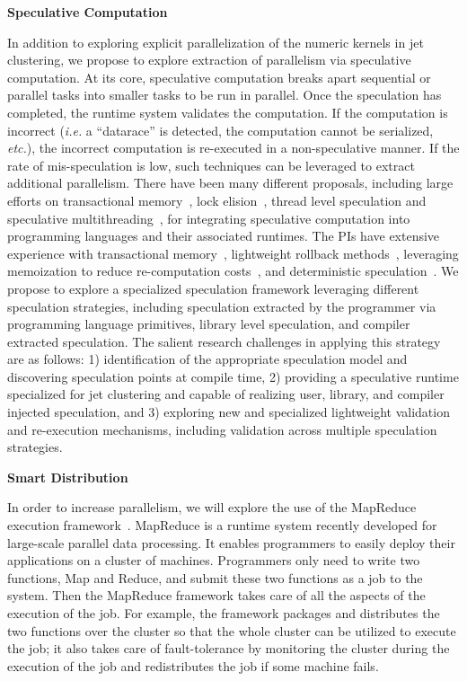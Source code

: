 \documentclass[times,11pt]{article}
\begin{document}
\bigskip
\noindent
{\bf Speculative Computation}
\bigskip

In addition to exploring explicit parallelization of the numeric kernels in jet clustering, we
propose to explore extraction of parallelism via speculative computation. At its core, speculative
computation breaks apart sequential or parallel tasks into smaller tasks to be run in parallel. Once
the speculation has completed, the runtime system validates the computation. If the computation is
incorrect ({\em i.e.} a ``datarace'' is detected, the computation cannot be serialized, {\em etc.}), the
incorrect computation is re-executed in a non-speculative manner.  If the rate of mis-speculation
is low, such techniques can be leveraged to extract additional
parallelism. 
There have been many different
proposals, including large efforts on transactional memory~\cite{Gramoli:2012:TCS:2168836.2168872,Bocchino:2008:STM:1345206.1345242,Adl-Tabatabai:2006:CRS:1133981.1133985,Usui:2010:ALC:1850844.1850945},
lock elision~\cite{Roy:2009:RSS:1519065.1519094}, thread level speculation and speculative
multithreading~\cite{Barreto:2012:UTS:2442626.2442639,Johnson:2004:MPD:996841.996851},
 for integrating speculative computation into programming languages
 and their associated runtimes.
The PIs have extensive experience with transactional memory~\cite{trans}, lightweight rollback methods~\cite{stab}, 
leveraging memoization to reduce re-computation costs~\cite{memo1, memo2},
and deterministic speculation~\cite{iso}. We propose to explore a specialized speculation framework leveraging different
speculation strategies, including speculation extracted by the programmer via programming language primitives,
library level speculation, and compiler extracted speculation.
The salient research
challenges in applying this strategy are as follows:  1)
identification of the appropriate speculation model and
discovering speculation points at compile time, 2) providing a speculative runtime specialized for jet clustering
and capable of realizing user, library, and compiler injected speculation, and 3) exploring new and specialized
lightweight validation and re-execution mechanisms, including validation across multiple speculation strategies.



\bigskip
\noindent
{\bf Smart Distribution}
\bigskip

In order to increase parallelism, we will explore the use of the MapReduce
execution framework~\cite{mapreduce-osdi, mapreduce-hadoop}. MapReduce is a
runtime system recently developed for large-scale parallel data processing. It
enables programmers to easily deploy their applications on a cluster of
machines. Programmers only need to write two functions, Map and Reduce, and
submit these two functions as a job to the system. Then the MapReduce framework
takes care of all the aspects of the execution of the job. For example, the
framework packages and distributes the two functions over the cluster so that
the whole cluster can be utilized to execute the job; it also takes care of
fault-tolerance by monitoring the cluster during the execution of the job and
redistributes the job if some machine fails.
\end{document}
